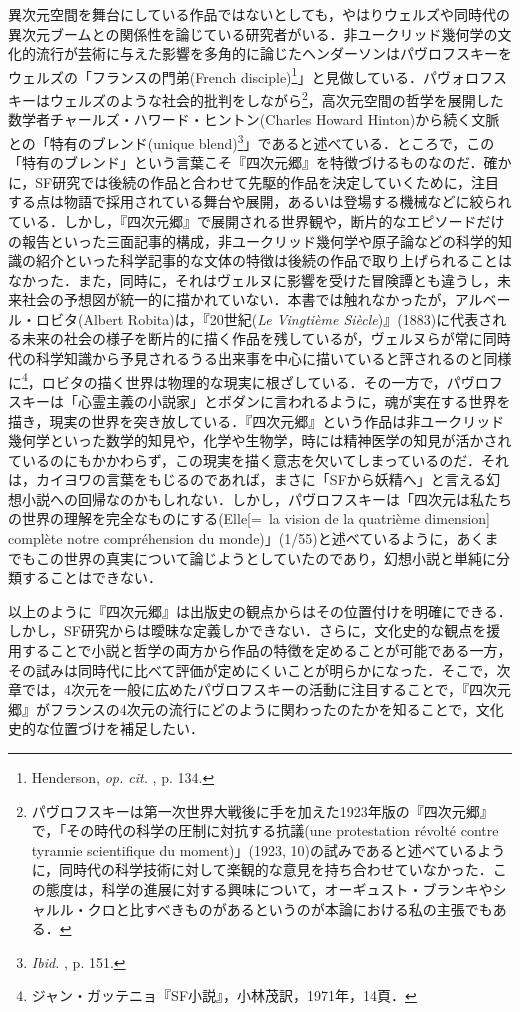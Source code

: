 異次元空間を舞台にしている作品ではないとしても，やはりウェルズや同時代の異次元ブームとの関係性を論じている研究者がいる．非ユークリッド幾何学の文化的流行が芸術に与えた影響を多角的に論じたヘンダーソンはパヴロフスキーをウェルズの「フランスの門弟(French disciple)\footnote{Henderson, \emph{op. cit. }, p. 134.}」と見做している．パヴォロフスキーはウェルズのような社会的批判をしながら\footnote{パヴロフスキーは第一次世界大戦後に手を加えた1923年版の『四次元郷』で，「その時代の科学の圧制に対抗する抗議(une protestation révolté contre tyrannie scientifique du moment)」(1923, 10)の試みであると述べているように，同時代の科学技術に対して楽観的な意見を持ち合わせていなかった．この態度は，科学の進展に対する興味について，オーギュスト・ブランキやシャルル・クロと比すべきものがあるというのが本論における私の主張でもある．}，高次元空間の哲学を展開した数学者チャールズ・ハワード・ヒントン(Charles Howard Hinton)から続く文脈との「特有のブレンド(unique blend)\footnote{\emph{Ibid. }, p. 151.}」であると述べている．ところで，この「特有のブレンド」という言葉こそ『四次元郷』を特徴づけるものなのだ．確かに，SF研究では後続の作品と合わせて先駆的作品を決定していくために，注目する点は物語で採用されている舞台や展開，あるいは登場する機械などに絞られている．しかし，『四次元郷』で展開される世界観や，断片的なエピソードだけの報告といった三面記事的構成，非ユークリッド幾何学や原子論などの科学的知識の紹介といった科学記事的な文体の特徴は後続の作品で取り上げられることはなかった．また，同時に，それはヴェルヌに影響を受けた冒険譚とも違うし，未来社会の予想図が統一的に描かれていない．本書では触れなかったが，アルベール・ロビタ(Albert Robita)は，『20世紀(\emph{Le Vingtième Siècle})』(1883)に代表される未来の社会の様子を断片的に描く作品を残しているが，ヴェルヌらが常に同時代の科学知識から予見されるうる出来事を中心に描いていると評されるのと同様に\footnote{ジャン・ガッテニョ『SF小説』，小林茂訳，1971年，14頁．}，ロビタの描く世界は物理的な現実に根ざしている．その一方で，パヴロフスキーは「心霊主義の小説家」とボダンに言われるように，魂が実在する世界を描き，現実の世界を突き放している．『四次元郷』という作品は非ユークリッド幾何学といった数学的知見や，化学や生物学，時には精神医学の知見が活かされているのにもかかわらず，この現実を描く意志を欠いてしまっているのだ．それは，カイヨワの言葉をもじるのであれば，まさに「SFから妖精へ」と言える幻想小説への回帰なのかもしれない．しかし，パヴロフスキーは「四次元は私たちの世界の理解を完全なものにする(Elle[=~la vision de la quatrième dimension] complète notre compréhension du monde)」(1/55)と述べているように，あくまでもこの世界の真実について論じようとしていたのであり，幻想小説と単純に分類することはできない．

以上のように『四次元郷』は出版史の観点からはその位置付けを明確にできる．しかし，SF研究からは曖昧な定義しかできない．さらに，文化史的な観点を援用することで小説と哲学の両方から作品の特徴を定めることが可能である一方，その試みは同時代に比べて評価が定めにくいことが明らかになった．そこで，次章では，4次元を一般に広めたパヴロフスキーの活動に注目することで，『四次元郷』がフランスの4次元の流行にどのように関わったのたかを知ることで，文化史的な位置づけを補足したい．

